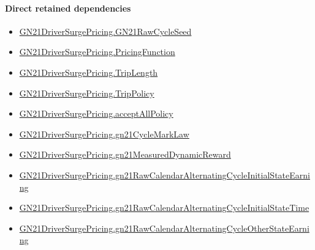 \documentclass[10pt]{article}
\begin{document}
\paragraph{Direct retained dependencies}
\begin{itemize}\raggedright
\item \hyperlink{governing-declaration-228de34d5811f602}{GN21\allowbreak{}Driver\allowbreak{}Surge\allowbreak{}Pricing.\allowbreak{}GN21\allowbreak{}Raw\allowbreak{}Cycle\allowbreak{}Seed}
\item \hyperlink{governing-declaration-9ab0ab344da5df05}{GN21\allowbreak{}Driver\allowbreak{}Surge\allowbreak{}Pricing.\allowbreak{}Pricing\allowbreak{}Function}
\item \hyperlink{governing-declaration-a616c143f22cf2bc}{GN21\allowbreak{}Driver\allowbreak{}Surge\allowbreak{}Pricing.\allowbreak{}Trip\allowbreak{}Length}
\item \hyperlink{governing-declaration-4312ad4cb899871f}{GN21\allowbreak{}Driver\allowbreak{}Surge\allowbreak{}Pricing.\allowbreak{}Trip\allowbreak{}Policy}
\item \hyperlink{governing-declaration-e94c9281d4f4b12d}{GN21\allowbreak{}Driver\allowbreak{}Surge\allowbreak{}Pricing.\allowbreak{}accept\allowbreak{}All\allowbreak{}Policy}
\item \hyperlink{governing-declaration-efacc1fa91256093}{GN21\allowbreak{}Driver\allowbreak{}Surge\allowbreak{}Pricing.\allowbreak{}gn21\allowbreak{}Cycle\allowbreak{}Mark\allowbreak{}Law}
\item \hyperlink{governing-declaration-e92066386ccc29f4}{GN21\allowbreak{}Driver\allowbreak{}Surge\allowbreak{}Pricing.\allowbreak{}gn21\allowbreak{}Measured\allowbreak{}Dynamic\allowbreak{}Reward}
\item \hyperlink{governing-declaration-70ba48e9ff578bf6}{GN21\allowbreak{}Driver\allowbreak{}Surge\allowbreak{}Pricing.\allowbreak{}gn21\allowbreak{}Raw\allowbreak{}Calendar\allowbreak{}Alternating\allowbreak{}Cycle\allowbreak{}Initial\allowbreak{}State\allowbreak{}Earning}
\item \hyperlink{governing-declaration-dc83c84bf96f074a}{GN21\allowbreak{}Driver\allowbreak{}Surge\allowbreak{}Pricing.\allowbreak{}gn21\allowbreak{}Raw\allowbreak{}Calendar\allowbreak{}Alternating\allowbreak{}Cycle\allowbreak{}Initial\allowbreak{}State\allowbreak{}Time}
\item \hyperlink{governing-declaration-e6e2b7a54354ab29}{GN21\allowbreak{}Driver\allowbreak{}Surge\allowbreak{}Pricing.\allowbreak{}gn21\allowbreak{}Raw\allowbreak{}Calendar\allowbreak{}Alternating\allowbreak{}Cycle\allowbreak{}Other\allowbreak{}State\allowbreak{}Earning}

\end{itemize}
\end{document}
